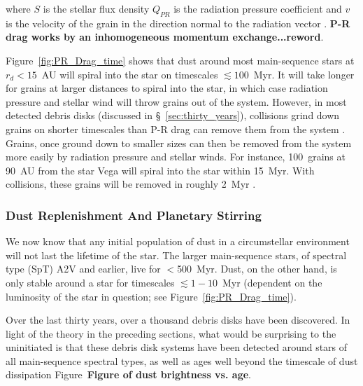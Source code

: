     \noindent where $S$ is the stellar flux density $Q_{PR}$ is the radiation pressure coefficient and $v$ is the velocity of the grain in the direction normal to the radiation vector \citep[i.e., orbital direction;][]{Burns1979}. \textbf{P-R drag works by an inhomogeneous momentum exchange...reword}.
    
    Figure~\ref{fig:PR_Drag_time} shows that dust around most main-sequence stars at $r_d<15$~AU will spiral into the star on timescales $\lesssim 100$~Myr. It will take longer for grains at larger distances to spiral into the star, in which case radiation pressure and stellar wind will throw grains out of the system. However, in most detected debris disks (discussed in \S~\ref{sec:thirty_years}), collisions grind down grains on shorter timescales than P-R drag can remove them from the system \citep[e.g.,][]{Wyatt2008}. Grains, once ground down to smaller sizes can then be removed from the system more easily by radiation pressure and stellar winds. For instance, 100\micron\  grains at 90~AU from the star Vega will spiral into the star within 15~Myr. With collisions, these grains will be removed in roughly 2~Myr \citep{Backman1993}. 
    
    \subsubsection{Dust Replenishment And Planetary Stirring}\label{sec:replenishment}
    
    We now know that any initial population of dust in a circumstellar environment will not last the lifetime of the star. The larger main-sequence stars, of spectral type (SpT) A2V and earlier, live for $<$500~Myr. Dust, on the other hand, is only stable around a star for timescales $\lesssim 1-10$~Myr (dependent on the luminosity of the star in question; see Figure~\ref{fig:PR_Drag_time}). 
    
    Over the last thirty years, over a thousand debris disks have been discovered. In light of the theory in the preceding sections, what would be surprising to the uninitiated is that these debris disk systems have been detected around stars of all main-sequence spectral types, as well as ages well beyond the timescale of dust dissipation Figure~\textbf{Figure of dust brightness vs. age}. 
    
    
